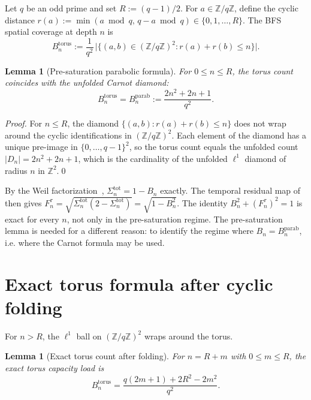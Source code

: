 \documentclass[12pt,a4paper]{article}
\newtheorem{lemma}[theorem]{Lemma}
\theoremstyle{remark}
\begin{document}
    Let $q$ be an odd prime and set $R := (q-1)/2$.
    For $a \in \mathbb{Z}/q\mathbb{Z}$, define the cyclic distance $r(a) := \min(a \bmod q,
  \, q - a \bmod q) \in \{0,1,\ldots,R\}$.
    The BFS spatial coverage at depth $n$ is
    \[
      B_n^{\mathrm{torus}}
      := \frac{1}{q^2}\,\bigl|\bigl\{(a,b) \in (\mathbb{Z}/q\mathbb{Z})^2
      : r(a) + r(b) \leq n\bigr\}\bigr|.
    \]

    \begin{lemma}[Pre-saturation parabolic formula]
      \label{lem:pre-saturation}
      For $0 \leq n \leq R$, the torus count coincides with the unfolded Carnot diamond:
      \[
        B_n^{\mathrm{torus}} = B_n^{\mathrm{parab}} := \frac{2n^2+2n+1}{q^2}.
      \]
    \end{lemma}

    \begin{proof}
      For $n \leq R$, the diamond $\{(a,b) : r(a)+r(b) \leq n\}$ does not wrap around the
      cyclic identifications in $(\mathbb{Z}/q\mathbb{Z})^2$.
      Each element of the diamond has a unique pre-image in $\{0,\ldots,q-1\}^2$, so the
      torus count equals the unfolded count $|D_n| = 2n^2+2n+1$,
      which is the cardinality of the unfolded $\ell^1$ diamond of radius $n$ in
      $\mathbb{Z}^2$.\qed
    \end{proof}

    By the Weil factorization~\cite{Beau2026n}, $\Sigma^{\mathrm{tot}}_n = 1 - B_n$ exactly.
    The temporal residual map of~\cite{Beau2026tp} then gives
    $F^\tau_n = \sqrt{\Sigma^{\mathrm{tot}}_n(2-\Sigma^{\mathrm{tot}}_n)} = \sqrt{1-B_n^2}$.
    The identity $B_n^2 + (F^\tau_n)^2 = 1$ is exact for every $n$, not only in the
    pre-saturation regime.
    The pre-saturation lemma is needed for a different reason: to identify the regime where
    $B_n = B_n^{\mathrm{parab}}$, i.e. where the Carnot formula may be used.

  \section{Exact torus formula after cyclic folding}
    \label{sec:torus-formula}

    For $n > R$, the $\ell^1$ ball on $(\mathbb{Z}/q\mathbb{Z})^2$ wraps around the torus.

    \begin{lemma}[Exact torus count after folding]
      \label{lem:torus-formula}
      For $n = R+m$ with $0 \leq m \leq R$, the exact torus capacity load is
      \[
        B_n^{\mathrm{torus}}
        = \frac{q(2m+1) + 2R^2 - 2m^2}{q^2}.
      \]
    \end{lemma}
\end{document}
